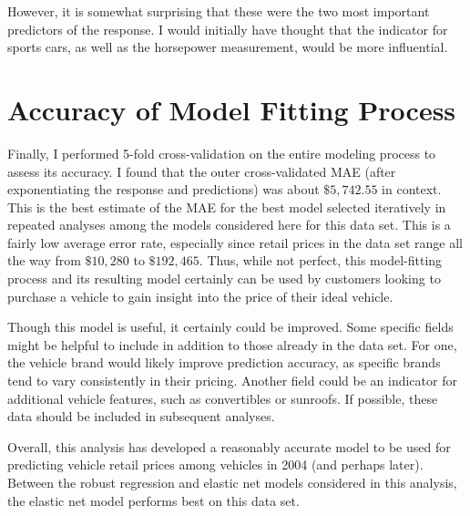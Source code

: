 \documentclass{article}
\begin{document}
However, it is somewhat surprising that these were the two most important predictors of the response.  
I would initially have thought that the indicator for sports cars, as well as the horsepower measurement, 
would be more influential.  

\section{Accuracy of Model Fitting Process}

Finally, I performed 5-fold cross-validation on the entire modeling process to assess its accuracy.  I 
found that the outer cross-validated MAE (after exponentiating the response and predictions) was about 
$\$5,742.55$ in context.  This is the best estimate of the MAE for the best model selected iteratively 
in repeated analyses among the models considered here for this data set.  This is a fairly low average 
error rate, especially since retail prices in the data set range all the way from $\$10,280$ to 
$\$192,465$.  Thus, while not perfect, this model-fitting process and its resulting model certainly can 
be used by customers looking to purchase a vehicle to gain insight into the price of their ideal vehicle.

Though this model is useful, it certainly could be improved. Some specific fields might be helpful to 
include in addition to those already in the data set. For one, the vehicle brand would likely improve 
prediction accuracy, as specific brands tend to vary consistently in their pricing. Another field could 
be an indicator for additional vehicle features, such as convertibles or sunroofs.  If possible, these 
data should be included in subsequent analyses.  

Overall, this analysis has developed a reasonably accurate model to be used for predicting vehicle 
retail prices among vehicles in 2004 (and perhaps later).  Between the robust regression and elastic 
net models considered in this analysis, the elastic net model performs best on this data set.  
\end{document}
